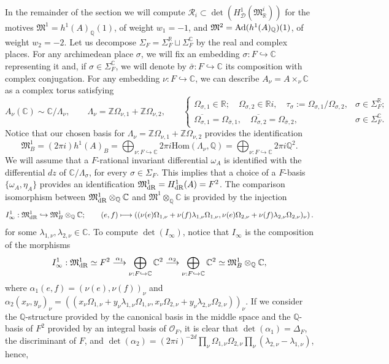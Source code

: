 \documentclass{amsart}
\theoremstyle{definition}
\theoremstyle{remark}
\numberwithin{equation}{section}
\newcommand{\Z}{{\mathbb Z}}
\newcommand{\mfM}{{\mathfrak M}}
\newcommand{\Q}{{\mathbb Q}}
\newcommand{\C}{{\mathbb C}}
\newcommand{\R}{{\mathbb R}}
\newcommand{\cR}{{\mathcal R}}
\newcommand{\cD}{{\mathcal D}}
\newcommand{\cO}{{\mathcal O}}
\newcommand{\Hom}{{\mathrm {Hom}}}
\begin{document}
In the remainder of the section we will compute $\cR_i\subset \det(H^1_\cD(\mfM^i_\R))$ for the motives $\mfM^1=h^1(A)_\Q(1)$, of weight $w_1=-1$, and $\mfM^2={\rm Ad}(h^1(A)_\Q)(1)$, of weight $w_2=-2$. Let us decompose $\Sigma_F=\Sigma_F^\R\sqcup\Sigma_F^\C$ by the real and complex places. For any archimedean place $\sigma$, we will fix an embedding $\sigma:F\hookrightarrow \C$ representing it and, if $\sigma\in\Sigma_F^\C$, we will denote by $\bar\sigma:F\hookrightarrow \C$ its composition with complex conjugation. For any embedding $\nu:F\hookrightarrow\C$, we can describe $A_{\nu}=A\times_{\nu}\C$ as a complex torus satisfying
\[
A_{\nu}(\C)\sim \C/\Lambda_{\nu},\qquad \Lambda_{\nu}=\Z\Omega_{{\nu},1}+\Z\Omega_{{\nu},2},\qquad \left\{\begin{array}{ll}
   \Omega_{\sigma,1}\in\R;\quad \Omega_{\sigma,2}\in \R i,\quad \tau_\sigma:=\Omega_{\sigma,1}/\Omega_{\sigma,2},  &\sigma\in\Sigma_F^\R;  \\
    \overline{\Omega_{\sigma,1}}=\Omega_{\bar\sigma,1},\quad\overline{\Omega_{\sigma,2}}=\Omega_{\bar\sigma,2}, & \sigma\in\Sigma_F^\C.
\end{array}\right.
\]
Notice that our chosen basis for $\Lambda_{\nu}=\Z\Omega_{{\nu},1}+\Z\Omega_{{\nu},2}$ provides the identification
    \[
    \mfM^1_B=(2\pi i)h^1(A)_{B}=\bigoplus_{\nu:F\hookrightarrow\C}2\pi i\Hom(\Lambda_{\nu},\Q)=\bigoplus_{\nu:F\hookrightarrow\C}2\pi i\Q^2.
    \]
    We will assume that a $F$-rational invariant differential $\omega_A$ is identified with the differential $dz$ of $\C/\Lambda_\sigma$, for every $\sigma\in\Sigma_F$. This implies that a choice of a $F$-basis $\{\omega_A,\eta_A\}$ provides an identification $\mfM^1_{\rm dR}=H^1_{\rm dR}(A)=F^2$. The comparison isomorphism between $\mfM^1_{\rm dR}\otimes_\Q\C$ and $\mfM^1\otimes_\Q\C$ is provided by the injection 
    \[
    I_{\infty}^1:\mfM^1_{\rm dR}\hookrightarrow \mfM^1_{B}\otimes_\Q\C;\qquad (e,f)\longmapsto \left(({\nu}(e)\Omega_{1,{\nu}}+{\nu}(f)\lambda_{1,{\nu}}\Omega_{1,{\nu}},{\nu}(e)\Omega_{2,{\nu}}+{\nu}(f)\lambda_{2,{\nu}}\Omega_{2,{\nu}})_\nu\right).
    \]
    for some $\lambda_{1,{\nu}},\lambda_{2,{\nu}}\in \C$.
    To compute $\det(I_{\infty})$, notice that $I_{\infty}$ is the composition of the morphisms
    \[
    I^1_{\infty}:\mfM^1_{\rm dR}\simeq F^2\stackrel{\alpha_1}{\longrightarrow}\bigoplus_{\nu:F\hookrightarrow\C}\C^2\stackrel{\alpha_2}{\longrightarrow}\bigoplus_{\nu:F\hookrightarrow\C}\C^2\simeq \mfM^1_B\otimes_\Q\C,
    \]
    where $\alpha_1(e,f)=(\nu(e),\nu(f))_\nu$ and $\alpha_2(x_\nu,y_\nu)_\nu=((x_\nu\Omega_{1,{\nu}}+y_\nu\lambda_{1,{\nu}}\Omega_{1,{\nu}},x_\nu\Omega_{2,{\nu}}+y_\nu\lambda_{2,{\nu}}\Omega_{2,{\nu}}))_\nu$. If we consider the $\Q$-structure provided by the canonical basis in the middle space and the $\Q$-basis of $F^2$ provided by an integral basis of $\cO_F$, it is clear that $\det(\alpha_1)=\Delta_F$, the discriminant of $F$, and $\det(\alpha_2)=(2\pi i)^{-2d}\prod_{\nu}\Omega_{1,{\nu}}\Omega_{2,{\nu}}\prod_{{\nu}}(\lambda_{2,{\nu}}-\lambda_{1,{\nu}})$, hence,
\end{document}
